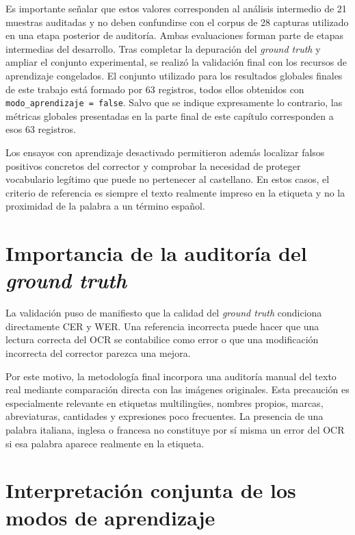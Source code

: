 Es importante señalar que estos valores corresponden al análisis intermedio de 21 muestras auditadas y no deben confundirse con el corpus de 28 capturas utilizado en una etapa posterior de auditoría. Ambas evaluaciones forman parte de etapas intermedias del desarrollo. Tras completar la depuración del \textit{ground truth} y ampliar el conjunto experimental, se realizó la validación final con los recursos de aprendizaje congelados. El conjunto utilizado para los resultados globales finales de este trabajo está formado por 63 registros, todos ellos obtenidos con \texttt{modo\_aprendizaje = false}. Salvo que se indique expresamente lo contrario, las métricas globales presentadas en la parte final de este capítulo corresponden a esos 63 registros.

Los ensayos con aprendizaje desactivado permitieron además localizar falsos positivos concretos del corrector y comprobar la necesidad de proteger vocabulario legítimo que puede no pertenecer al castellano. En estos casos, el criterio de referencia es siempre el texto realmente impreso en la etiqueta y no la proximidad de la palabra a un término español.

\section{Importancia de la auditoría del \textit{ground truth}}

La validación puso de manifiesto que la calidad del \textit{ground truth} condiciona directamente CER y WER. Una referencia incorrecta puede hacer que una lectura correcta del OCR se contabilice como error o que una modificación incorrecta del corrector parezca una mejora.

Por este motivo, la metodología final incorpora una auditoría manual del texto real mediante comparación directa con las imágenes originales. Esta precaución es especialmente relevante en etiquetas multilingües, nombres propios, marcas, abreviaturas, cantidades y expresiones poco frecuentes. La presencia de una palabra italiana, inglesa o francesa no constituye por sí misma un error del OCR si esa palabra aparece realmente en la etiqueta.

\section{Interpretación conjunta de los modos de aprendizaje}

